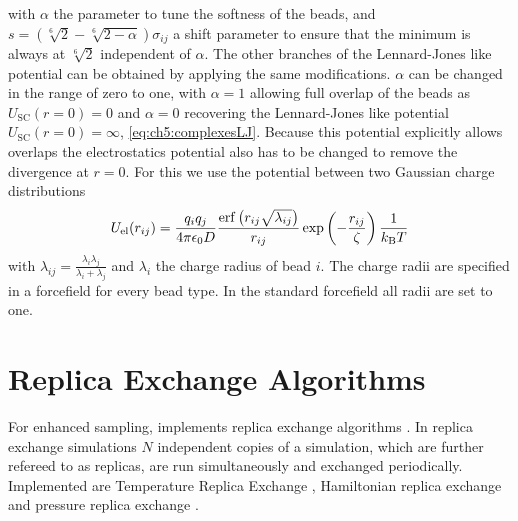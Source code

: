 \documentclass[12pt, twoside]{report}
\begin{document}
with \(\alpha\) the parameter to tune the softness of the beads, and
$s=\left(\sqrt[6]{2} - \sqrt[6]{2-\alpha}\right) \sigma_{ij}$ a shift parameter
to ensure that the minimum is always at \(\sqrt[6]{2}\) independent of
\(\alpha\). The other branches of the Lennard-Jones like potential can be
obtained by applying the same modifications. \(\alpha\) can be changed in the
range of zero to one, with \(\alpha=1\) allowing full overlap of the beads as
\(U_{\mathrm{SC}}(r=0)=0\) and \(\alpha=0\) recovering the Lennard-Jones like
potential \(U_{\mathrm{SC}}(r=0)=\infty\), \cref{eq:ch5:complexesLJ}. Because
this potential explicitly allows overlaps the electrostatics potential also has
to be changed to remove the divergence at \(r=0\). For this we use the potential
between two Gaussian charge distributions \cite{yarkony1995}
\begin{align}
  U_{\mathrm{el}}(r_{ij}) = \frac{q_i q_j}{4 \pi \epsilon_0
D}\frac{\mathrm{erf}\left(r_{ij}\sqrt{\lambda_{ij}}\right)}{r_{ij}}
\exp\left(-\frac{r_{ij}}{\zeta}\right) \frac{1}{k_{\mathrm{B}}T}
\end{align}
with \(\lambda_{ij}=\frac{\lambda_i \lambda_j}{\lambda_i + \lambda_j}\) and
\(\lambda_i\) the charge radius of bead \(i\). The charge radii are specified in
a forcefield for every bead type. In the standard \complexes forcefield all
radii are set to one.

\chapter{Replica Exchange Algorithms}

For enhanced sampling, \complexes implements replica exchange algorithms
\cite{Swendsen1986, Bennett1976, tuckerman2010statistical}. In replica exchange
simulations \(N\) independent copies of a simulation, which are further refereed
to as replicas, are run simultaneously and exchanged periodically. Implemented
are Temperature Replica Exchange \cite{Hansmann1997}, Hamiltonian replica
exchange \cite{Bussi2014} and pressure replica exchange \cite{Okabe2001}.
\end{document}
